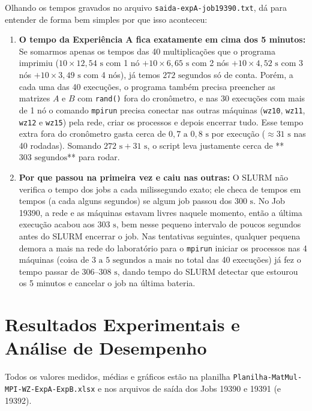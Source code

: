 \documentclass[12pt, a4paper, twoside, chapter=TITLE, subsection=TITLE, section=TITLE, subsubsection=TITLE, english, brazil]{abntex2}
\begin{document}
Olhando os tempos gravados no arquivo \nolinkurl{saida-expA-job19390.txt}, dá para entender de forma bem simples por que isso aconteceu:
\begin{enumerate}
    \item \textbf{O tempo da Experiência A fica exatamente em cima dos 5 minutos:} Se somarmos apenas os tempos das 40 multiplicações que o programa imprimiu ($10 \times 12,54\text{ s}$ com 1 nó $+ 10 \times 6,65\text{ s}$ com 2 nós $+ 10 \times 4,52\text{ s}$ com 3 nós $+ 10 \times 3,49\text{ s}$ com 4 nós), já temos \textbf{$272\text{ segundos}$} só de conta. Porém, a cada uma das 40 execuções, o programa também precisa preencher as matrizes $A$ e $B$ com \texttt{rand()} fora do cronômetro, e nas 30 execuções com mais de 1 nó o comando \texttt{mpirun} precisa conectar nas outras máquinas (\texttt{wz10}, \texttt{wz11}, \texttt{wz12} e \texttt{wz15}) pela rede, criar os processos e depois encerrar tudo. Esse tempo extra fora do cronômetro gasta cerca de $0,7\text{ a }0,8\text{ s}$ por execução ($\approx 31\text{ s}$ nas 40 rodadas). Somando $272\text{ s} + 31\text{ s}$, o script leva justamente cerca de **$303\text{ segundos}$** para rodar.
    \item \textbf{Por que passou na primeira vez e caiu nas outras:} O SLURM não verifica o tempo dos jobs a cada milissegundo exato; ele checa de tempos em tempos (a cada alguns segundos) se algum job passou dos $300\text{ s}$. No Job 19390, a rede e as máquinas estavam livres naquele momento, então a última execução acabou aos $303\text{ s}$, bem nesse pequeno intervalo de poucos segundos antes do SLURM encerrar o job. Nas tentativas seguintes, qualquer pequena demora a mais na rede do laboratório para o \texttt{mpirun} iniciar os processos nas 4 máquinas (coisa de $3\text{ a }5\text{ segundos}$ a mais no total das 40 execuções) já fez o tempo passar de $306\text{--}308\text{ s}$, dando tempo do SLURM detectar que estourou os 5 minutos e cancelar o job na última bateria.
\end{enumerate}

\chapter{Resultados Experimentais e Análise de Desempenho}

Todos os valores medidos, médias e gráficos estão na planilha \nolinkurl{Planilha-MatMul-MPI-WZ-ExpA-ExpB.xlsx} e nos arquivos de saída dos Jobs 19390 e 19391 (e 19392).
\end{document}

